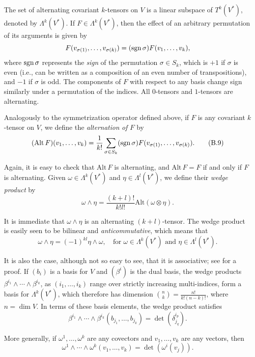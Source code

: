 The set of alternating covariant $k$-tensors on $V$ is a linear subspace of $T^k(V^*)$, denoted by $\Lambda^k(V^*)$. If $F \in \Lambda^k(V^*)$, then the effect of an arbitrary permutation of its arguments is given by
\[
F(v_{\sigma(1)},\ldots,v_{\sigma(k)}) = (\operatorname{sgn} \sigma)F(v_1,\ldots,v_k),
\]
where $\operatorname{sgn} \sigma$ represents the \textit{sign} of the permutation $\sigma \in S_k$, which is $+1$ if $\sigma$ is even (i.e., can be written as a composition of an even number of transpositions), and $-1$ if $\sigma$ is odd. The components of $F$ with respect to any basis change sign similarly under a permutation of the indices. All $0$-tensors and $1$-tensors are alternating.

Analogously to the symmetrization operator defined above, if $F$ is any covariant $k$-tensor on $V$, we define the \textit{alternation of $F$} by
\begin{equation}
(\mathrm{Alt}\, F)(v_1,\ldots,v_k) = \frac{1}{k!} \sum_{\sigma \in S_k} (\operatorname{sgn} \sigma) F(v_{\sigma(1)},\ldots,v_{\sigma(k)}).
\tag{B.9}
\end{equation}

Again, it is easy to check that $\mathrm{Alt}\, F$ is alternating, and $\mathrm{Alt}\, F = F$ if and only if $F$ is alternating. Given $\omega \in \Lambda^k(V^*)$ and $\eta \in \Lambda^l(V^*)$, we define their \textit{wedge product} by
\[
\omega \wedge \eta = \frac{(k+l)!}{k!l!} \mathrm{Alt}(\omega \otimes \eta).
\]

It is immediate that $\omega \wedge \eta$ is an alternating $(k + l)$-tensor. The wedge product is easily seen to be bilinear and \textit{anticommutative}, which means that
\[
\omega \wedge \eta = (-1)^{kl} \eta \wedge \omega, \quad \text{for } \omega \in \Lambda^k(V^*) \text{ and } \eta \in \Lambda^l(V^*).
\]

It is also the case, although not so easy to see, that it is associative; see \cite[Prop.~14.11]{LeeSM} for a proof. If $(b_i)$ is a basis for $V$ and $(\beta^i)$ is the dual basis, the wedge products $\beta^{i_1} \wedge \cdots \wedge \beta^{i_k}$, as $(i_1,\ldots,i_k)$ range over strictly increasing multi-indices, form a basis for $\Lambda^k(V^*)$, which therefore has dimension $\binom{n}{k} = \frac{n!}{k!(n-k)!}$, where $n = \dim V$. In terms of these basis elements, the wedge product satisfies
\[
\beta^{i_1} \wedge \cdots \wedge \beta^{i_k}(b_{j_1},\ldots,b_{j_k}) = \det(\delta^{i_p}_{j_q}).
\]

More generally, if $\omega^1,\ldots,\omega^k$ are any covectors and $v_1,\ldots,v_k$ are any vectors, then
\begin{equation}
\omega^1 \wedge \cdots \wedge \omega^k(v_1,\ldots,v_k) = \det(\omega^i(v_j)).
\tag{B.10}
\end{equation}

